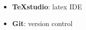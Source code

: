 \begin{itemize}
\item \textbf{TeXstudio}: latex IDE
\item \textbf{Git}: version control
\end{itemize}